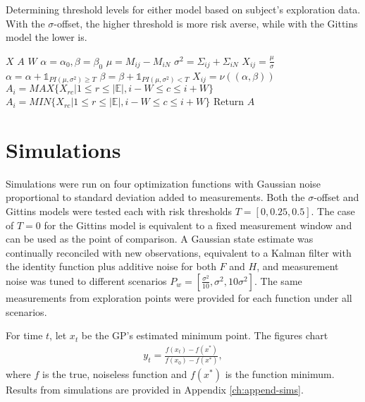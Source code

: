 \begin{algorithm}[t]
\caption{Determining threshold levels for either model based on subject's exploration data. With the $\sigma$-offset, the higher threshold is more risk averse, while with the Gittins model the lower is.}
\label{alg:adapthresh}
\begin{algorithmic}
\State {} $X$
\State {} $A$
\State {} $W$
  \State $\alpha = \alpha_0, \beta = \beta_0$
    \State $\mu = M_{ij} - M_{iN}$
    \State $\sigma^2 = \Sigma_{ij} + \Sigma_{iN}$
      \State $X_{ij} = \frac{\mu}{\sigma}$
    \EndIf
      \State $\alpha = \alpha + \mathbb{1}_{PI(\mu, \sigma^2) \geq T}$
      \State $\beta = \beta + \mathbb{1}_{PI(\mu, \sigma^2) < T}$
      \State $X_{ij} = \nu((\alpha, \beta))$
    \EndIf
  \End
\End
{}
    \State $A_{i} = MAX\{X_{rc}\vert 1 \leq r \leq \vert\mathbb{E}\vert, i-W \leq c \leq i+W\}$
  \EndIf
    \State $A_{i} = MIN\{X_{rc}\vert 1 \leq r \leq \vert\mathbb{E}\vert, i-W \leq c \leq i+W\}$
  \EndIf
\End
\State Return $A$
\end{algorithmic}
\end{algorithm}

\section{Simulations}
Simulations were run on four optimization functions with Gaussian noise proportional to standard deviation added to measurements. Both the $\sigma$-offset and Gittins models were tested each with risk thresholds $T=[0, 0.25, 0.5]$. The case of $T=0$ for the Gittins model is equivalent to a fixed measurement window and can be used as the point of comparison. A Gaussian state estimate was continually reconciled with new observations, equivalent to a Kalman filter with the identity function plus additive noise for both $F$ and $H$, and measurement noise was tuned to different scenarios $P_w=[\frac{\sigma^2}{10}, \sigma^2, 10\sigma^2]$. The same measurements from exploration points were provided for each function under all scenarios.

For time $t$, let $x_t$ be the GP's estimated minimum point. The figures chart
\begin{align}
  y_t = \frac{f(x_t) - f(x^*)}{f(x_0) - f(x^*)},
\end{align}
where $f$ is the true, noiseless function and $f(x^*)$ is the function minimum. Results from simulations are provided in Appendix \ref{ch:append-sims}. 

